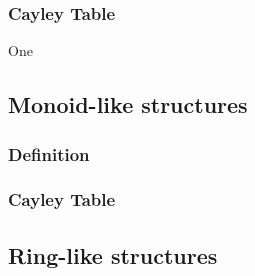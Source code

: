 \documentclass{article}
\begin{document}
\subsubsection{Cayley Table}
One 
\subsection{Monoid-like structures}
\subsubsection{Definition}
\subsubsection{Cayley Table}
\subsection{Ring-like structures}
\end{document}
